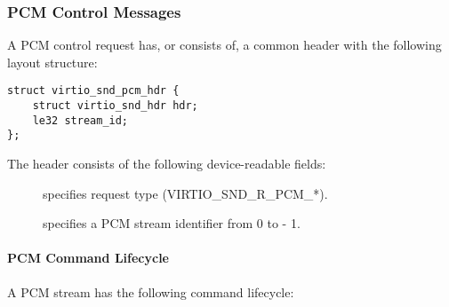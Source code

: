 \subsubsection{PCM Control Messages}\label{sec:Device Types / Sound Device / Device Operation / PCM Control Messages}

A PCM control request has, or consists of, a common header with the following
layout structure:

\begin{lstlisting}
struct virtio_snd_pcm_hdr {
    struct virtio_snd_hdr hdr;
    le32 stream_id;
};
\end{lstlisting}

The header consists of the following device-readable fields:

\begin{description}
\item[] specifies request type (VIRTIO_SND_R_PCM_*).
\item[] specifies a PCM stream identifier from 0 to  - 1.
\end{description}

\paragraph{PCM Command Lifecycle}

A PCM stream has the following command lifecycle:

